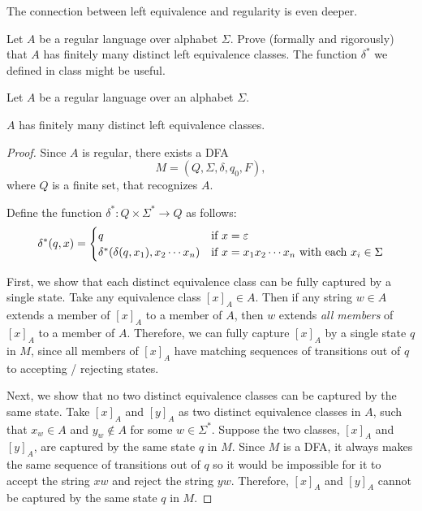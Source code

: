 \begin{problem}
  The connection between left equivalence and regularity is even deeper.
  \begin{enumalph}
    \item Let $A$ be a regular language over alphabet $\Sigma$.
      Prove (formally and rigorously) that $A$ has finitely many
      distinct left equivalence classes.
      The function $\delta^*$ we defined in class might be useful.
      \begin{Answer}
        Let $A$ be a regular language over an alphabet $\Sigma$.
        \begin{claim}
          $A$ has finitely many distinct left equivalence classes.

          \begin{proof}
            Since $A$ is regular, there exists a DFA
            \[ M = (Q, \Sigma, \delta, q_0, F), \]
            where $Q$ is a finite set, that recognizes $A$.

            \step
            Define the function $\delta^*: Q \times \Sigma^* \to Q$ as follows:
            \[ \delta^*(q, x) =
              \begin{cases}
                q & \text{if } x = \varepsilon \\
                \delta^*(\delta(q, x_1), x_2 \cdots x_n) & \text{if $x = x_1 x_2 \cdots x_n$ with each $x_i \in \Sigma$}
              \end{cases}
            \]

            \step
            First, we show that each distinct equivalence class can be fully captured by a single state.
            Take any equivalence class $[x]_A \in A$.
            Then if any string $w \in A$ extends a member of $[x]_A$ to a member of $A$,
            then $w$ extends \emph{all members} of $[x]_A$ to a member of $A$.
            Therefore, we can fully capture $[x]_A$ by a single state $q$ in $M$,
            since all members of $[x]_A$ have matching sequences of transitions out of $q$
            to accepting / rejecting states.

            \step
            Next, we show that no two distinct equivalence classes can be captured by the same state.
            Take $[x]_A$ and $[y]_A$ as two distinct equivalence classes in $A$,
            such that $x_w \in A$ and $y_w \notin A$ for some $w \in \Sigma^*$.
            Suppose the two classes, $[x]_A$ and $[y]_A$, are captured by the same state $q$ in $M$.
            Since $M$ is a DFA, it always makes the same sequence of transitions out of $q$
            so it would be impossible for it to accept the string $xw$ and reject the string $yw$.
            Therefore, $[x]_A$ and $[y]_A$ cannot be captured by the same state $q$ in $M$.


\end{proof}
\end{claim}
\end{Answer}
\end{enumalph}
\end{problem}
